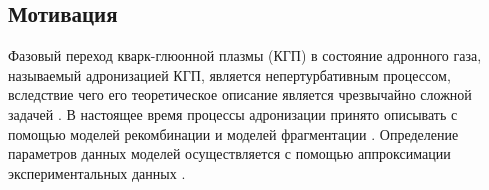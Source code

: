 \begin{comment}
	\section{Рождение частиц в столкновениях релятивистских ионов}
	\section{Отношения частиц и химическое равновесие}
	Различия между механизмами рождения различных адронов могут быть установлены с помощью отношения их инвариантных спектров по поперечному импульсу. Установлено [], что отношения рожденных адронов хорошо описываются простой статистической моделью [].
	\begin{figure}[ht] 
		\centerfloat
		\includegraphics [width = 0.9\linewidth] {Intro/RatiosExp.png}
		\caption{Отношения выходов адронов. Сравнение между статистической моделью (горизонтальные линии) и экспериментальными отношениями (круги)} 
		\label{img:RatiosExp}  
	\end{figure}
	
	Статистическая модель основана на использовании большого канонического ансамбля для описания статистической суммы и, следовательно, плотности частиц вида $i$ в равновесном состоянии кварк-глонной материи:
	\begin{equation}
		\label{eq:Ratio}
		n_i = \frac{g_i}{2 \pi ^2}\int_0^{\infty} \frac{p^2 dp}{exp[(E_i - \mu_i)/T_{ch}]\pm 1}
	\end{equation}
	где  $n_i$ - плотность частиц, $g_i$ - спиновое вырождение, $p$ - импульс, $E$ - полная энергия и $\mu_i =\mu_B B_i - \mu_S S_i - \mu_{I_3} I_{3i}$ - химический потенциал. Величины $B_i$, $S_i$ и $I_{3i}$ представляют собой барионное число, странность и третью компоненту изоспина для частицы вида $i$. В данной модели присутствуют только два параметра: температура $T_{ch}$ и барионный химический потенциал $\mu_B$, которые являются независимыми.  На рис. ??? показано сравнение измеренных интегральных отношений выходов частиц частиц и расчетов согласно статистической модели. Как видно из рисунка, данная модель хорошо согласовывается с экспериментальными данными.
	Совпадаение экспериментальных данных с расчетсами статистической модели указывает на сохранение химического равновесия в системе. 
\end{comment}

\subsection{Мотивация}
Фазовый переход кварк-глюонной плазмы (КГП) \cite{QGP} в состояние адронного газа, называемый адронизацией КГП, является непертурбативным процессом, вследствие чего его теоретическое описание является чрезвычайно сложной задачей \cite{Coalescence_models}. В настоящее время процессы адронизации принято описывать с помощью моделей рекомбинации \cite{Coalescence_models, Recombination1, Recombination2} и моделей фрагментации \cite{FragmentationLund}. Определение параметров данных моделей осуществляется с помощью аппроксимации экспериментальных данных \cite{Coalescence_models, AMPT}. 

